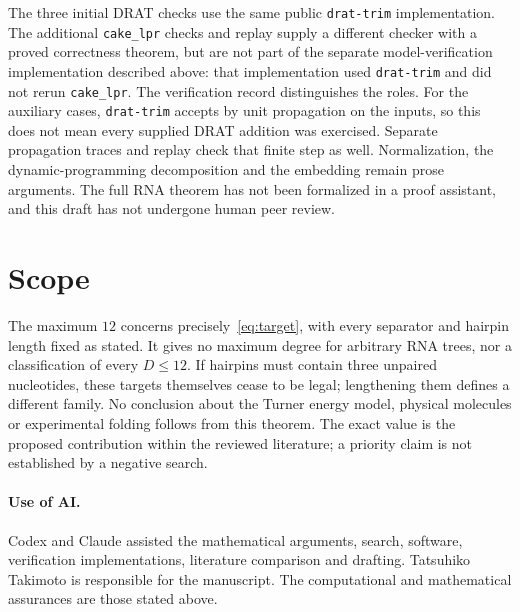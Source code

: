 \documentclass[11pt,a4paper]{article}
\theoremstyle{definition}
\begin{document}
The three initial DRAT checks use the same public \texttt{drat-trim}
implementation. The additional \texttt{cake\_lpr} checks and replay
supply a different checker with a proved correctness theorem, but are
not part of the separate model-verification implementation described
above: that implementation used \texttt{drat-trim} and did not rerun
\texttt{cake\_lpr}. The verification record distinguishes the roles.
For the auxiliary cases, \texttt{drat-trim} accepts by unit propagation
on the inputs, so this does not mean every supplied DRAT addition was
exercised. Separate propagation traces and replay check that finite
step as well. Normalization, the dynamic-programming decomposition and
the embedding remain prose arguments. The full RNA theorem has not
been formalized in a proof assistant, and this draft has not undergone
human peer review.

\section{Scope}
The maximum $12$ concerns precisely~\eqref{eq:target}, with every
separator and hairpin length fixed as stated. It gives no maximum
degree for arbitrary RNA trees, nor a classification of every
$D\leq12$. If hairpins must contain three unpaired nucleotides, these
targets themselves cease to be legal; lengthening them defines a
different family. No conclusion about the Turner energy model,
physical molecules or experimental folding follows from this theorem.
The exact value is the proposed contribution within the reviewed
literature; a priority claim is not established by a negative search.

\paragraph{Use of AI.}
Codex and Claude assisted the mathematical arguments, search, software,
verification implementations, literature comparison and drafting.
Tatsuhiko Takimoto is responsible for the manuscript. The computational
and mathematical assurances are those stated above.
\end{document}
